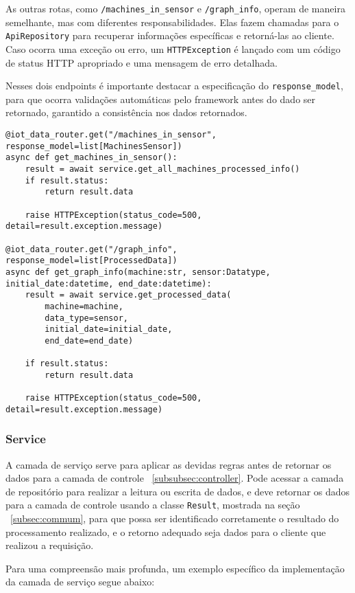 As outras rotas, como \texttt{/machines\_in\_sensor} e \texttt{/graph\_info}, operam de maneira semelhante, mas com diferentes responsabilidades. Elas fazem chamadas para o \texttt{ApiRepository} para recuperar informações específicas e retorná-las ao cliente. Caso ocorra uma exceção ou erro, um \texttt{HTTPException} é lançado com um código de status HTTP apropriado e uma mensagem de erro detalhada.

Nesses dois endpoints é importante destacar a especificação do \texttt{response\_model}, para que ocorra validações automáticas pelo framework antes do dado ser retornado, garantido a consistência nos dados retornados.

\begin{verbatim}
@iot_data_router.get("/machines_in_sensor", response_model=list[MachinesSensor])
async def get_machines_in_sensor():
    result = await service.get_all_machines_processed_info()
    if result.status:
        return result.data
    
    raise HTTPException(status_code=500, detail=result.exception.message)

@iot_data_router.get("/graph_info", response_model=list[ProcessedData])
async def get_graph_info(machine:str, sensor:Datatype, initial_date:datetime, end_date:datetime):
    result = await service.get_processed_data(
        machine=machine,
        data_type=sensor,
        initial_date=initial_date,
        end_date=end_date)
    
    if result.status:
        return result.data
    
    raise HTTPException(status_code=500, detail=result.exception.message)
\end{verbatim}

\subsubsection{Service}\label{subsubsec:service}
A camada de serviço serve para aplicar as devidas regras antes de retornar os dados para a camada de controle ~\ref{subsubsec:controller}. Pode acessar a camada de repositório para realizar a leitura ou escrita de dados, e deve retornar os dados para a camada de controle usando a classe \texttt{Result}, mostrada na seção ~\ref{subsec:commum}, para que possa ser identificado corretamente o resultado do processamento realizado, e o retorno adequado seja dados para o cliente que realizou a requisição. 

Para uma compreensão mais profunda, um exemplo específico da implementação da camada de serviço segue abaixo:

